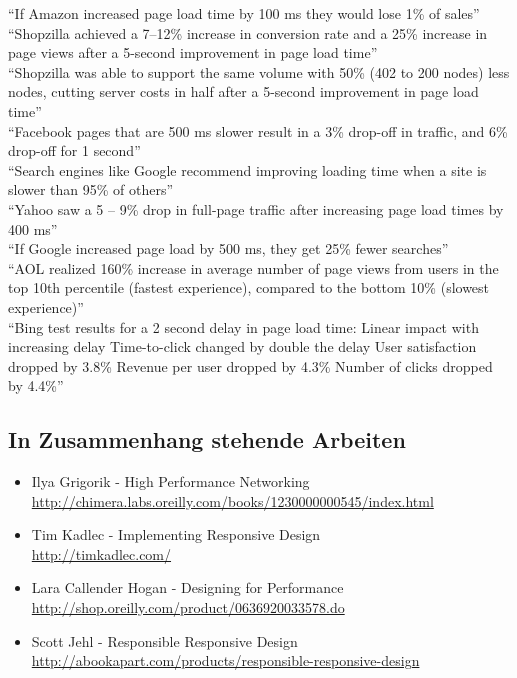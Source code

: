 	“If Amazon increased page load time by 100 ms they would lose 1\% of sales”\\

	“Shopzilla achieved a 7–12\% increase in conversion rate and a 25\% increase in page views after a 5-second improvement in page load time”\\

	“Shopzilla was able to support the same volume with 50\% (402 to 200 nodes) less nodes, cutting server costs in half after a 5-second improvement in page load time”\\

	“Facebook pages that are 500 ms slower result in a 3\% drop-off in traffic, and 6\% drop-off for 1 second”\\

	“Search engines like Google recommend improving loading time when a site is slower than 95\% of others”\\

	“Yahoo saw a 5 – 9\% drop in full-page traffic after increasing page load times by 400 ms”\\

	“If Google increased page load by 500 ms, they get 25\% fewer searches”\\

	“AOL realized 160\% increase in average number of page views from users in the top 10th percentile (fastest experience), compared to the bottom 10\% (slowest experience)”\\

	“Bing test results for a 2 second delay in page load time:
	Linear impact with increasing delay
	Time-to-click changed by double the delay
	User satisfaction dropped by 3.8\%
	Revenue per user dropped by 4.3\%
	Number of clicks dropped by 4.4\%”\\

	

	\subsection{In Zusammenhang stehende Arbeiten} %
	\label{sub:in_zusammenhang_stehende_arbeiten}
	\begin{itemize}
		\item Ilya Grigorik - High Performance Networking\\
		\url{http://chimera.labs.oreilly.com/books/1230000000545/index.html} 

		\item Tim Kadlec - Implementing Responsive Design\\
		\url{http://timkadlec.com/} 

		\item Lara Callender Hogan - Designing for Performance\\
		\url{http://shop.oreilly.com/product/0636920033578.do} 

		\item Scott Jehl - Responsible Responsive Design\\
		\url{http://abookapart.com/products/responsible-responsive-design} 
	\end{itemize}

